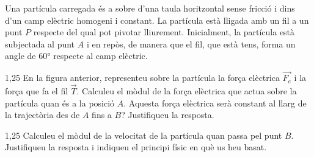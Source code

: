 Una partícula carregada és a sobre d'una taula horitzontal sense fricció i dins d'un camp elèctric homogeni i constant. La partícula està lligada amb un fil a un punt $P$ respecte del qual pot pivotar lliurement. Inicialment, la partícula està subjectada al punt $A$ i en repòs, de manera que el fil, que està tens, forma un angle de 60° respecte al camp elèctric.


\begin{apartat}{1,25}
En la figura anterior, representeu sobre la partícula la força elèctrica $\vec{F_e}$ i la força que fa el fil $\vec{T}$. Calculeu el mòdul de la força elèctrica que actua sobre la partícula quan és a la posició $A$. Aquesta força elèctrica serà constant al llarg de la trajectòria des de $A$ fins a $B$? Justifiqueu la resposta.
\end{apartat}

\begin{apartat}{1,25}
Calculeu el mòdul de la velocitat de la partícula quan passa pel punt $B$. Justifiqueu la resposta i indiqueu el principi físic en què us heu basat.
\end{apartat}

